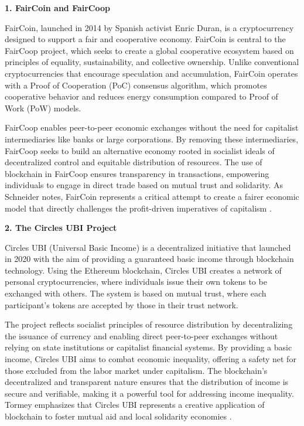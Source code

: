 \begin{refsection}
\textbf{1. FairCoin and FairCoop}

FairCoin, launched in 2014 by Spanish activist Enric Duran, is a cryptocurrency designed to support a fair and cooperative economy. FairCoin is central to the FairCoop project, which seeks to create a global cooperative ecosystem based on principles of equality, sustainability, and collective ownership. Unlike conventional cryptocurrencies that encourage speculation and accumulation, FairCoin operates with a Proof of Cooperation (PoC) consensus algorithm, which promotes cooperative behavior and reduces energy consumption compared to Proof of Work (PoW) models.

FairCoop enables peer-to-peer economic exchanges without the need for capitalist intermediaries like banks or large corporations. By removing these intermediaries, FairCoop seeks to build an alternative economy rooted in socialist ideals of decentralized control and equitable distribution of resources. The use of blockchain in FairCoop ensures transparency in transactions, empowering individuals to engage in direct trade based on mutual trust and solidarity. As Schneider notes, FairCoin represents a critical attempt to create a fairer economic model that directly challenges the profit-driven imperatives of capitalism \cite[pp.~120-125]{schneider2018}.

\textbf{2. The Circles UBI Project}

Circles UBI (Universal Basic Income) is a decentralized initiative that launched in 2020 with the aim of providing a guaranteed basic income through blockchain technology. Using the Ethereum blockchain, Circles UBI creates a network of personal cryptocurrencies, where individuals issue their own tokens to be exchanged with others. The system is based on mutual trust, where each participant’s tokens are accepted by those in their trust network.

The project reflects socialist principles of resource distribution by decentralizing the issuance of currency and enabling direct peer-to-peer exchanges without relying on state institutions or capitalist financial systems. By providing a basic income, Circles UBI aims to combat economic inequality, offering a safety net for those excluded from the labor market under capitalism. The blockchain’s decentralized and transparent nature ensures that the distribution of income is secure and verifiable, making it a powerful tool for addressing income inequality. Tormey emphasizes that Circles UBI represents a creative application of blockchain to foster mutual aid and local solidarity economies \cite[pp.~75-78]{tormey2015}.


\end{refsection}
